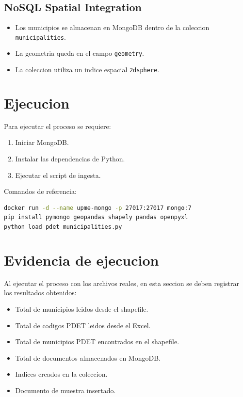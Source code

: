 \documentclass[12pt]{article}
\begin{document}
\subsection{NoSQL Spatial Integration}

\begin{itemize}[leftmargin=*]
    \item Los municipios se almacenan en MongoDB dentro de la coleccion \texttt{municipalities}.
    \item La geometria queda en el campo \texttt{geometry}.
    \item La coleccion utiliza un indice espacial \texttt{2dsphere}.
\end{itemize}

\section{Ejecucion}

Para ejecutar el proceso se requiere:

\begin{enumerate}[leftmargin=*]
    \item Iniciar MongoDB.
    \item Instalar las dependencias de Python.
    \item Ejecutar el script de ingesta.
\end{enumerate}

Comandos de referencia:

\begin{lstlisting}[style=basicstyle,language=bash]
docker run -d --name upme-mongo -p 27017:27017 mongo:7
pip install pymongo geopandas shapely pandas openpyxl
python load_pdet_municipalities.py
\end{lstlisting}

\section{Evidencia de ejecucion}

Al ejecutar el proceso con los archivos reales, en esta seccion se deben registrar los resultados obtenidos:

\begin{itemize}[leftmargin=*]
    \item Total de municipios leidos desde el shapefile.
    \item Total de codigos PDET leidos desde el Excel.
    \item Total de municipios PDET encontrados en el shapefile.
    \item Total de documentos almacenados en MongoDB.
    \item Indices creados en la coleccion.
    \item Documento de muestra insertado.
\end{itemize}
\end{document}
